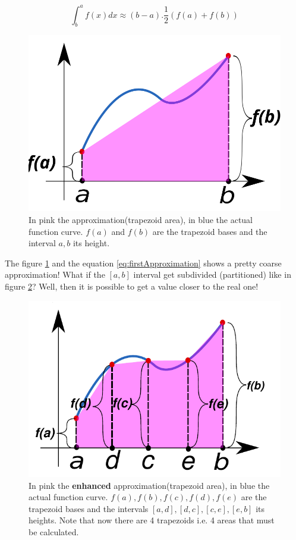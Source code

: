 	\begin{equation}
		\int^a_b{f(x) dx} \approx (b-a).\dfrac{1}{2}(f(a)+f(b))
		\label{eq:firstApproximation}
	\end{equation}

	\begin{figure}[h]
		\centering
		\includegraphics[width=0.7\linewidth]{images/Trapezoidal_rule_illustration}
		\caption[Approximation of an integral]{In pink the approximation(trapezoid area), in blue the actual function curve. $f(a)$ and $f(b)$ are the trapezoid bases and the interval $a, b$ its height. }
		\label{fig:trapezoidalruleillustration}
	\end{figure}
	
	\par The figure \ref{fig:trapezoidalruleillustration} and the equation \ref{eq:firstApproximation} shows a pretty coarse approximation! What if the $[a, b]$ interval get subdivided (partitioned) like in figure \ref{fig:trapezoidalruleillustration2}? Well, then it is possible to get a value closer to the real one!\newline
	
	\begin{figure}[h]
		\centering
		\includegraphics[width=0.7\linewidth]{images/Trapezoidal_rule_illustration2}
		\caption[Enhanced approximation of an integral]{In pink the \textbf{enhanced} approximation(trapezoid area), in blue the actual function curve. $f(a), f(b), f(c), f(d), f(e)$ are the trapezoid bases and the intervals $[a, d],[d,c], [c,e], [e,b]$ its heights. Note that now there are 4 trapezoids i.e. 4 areas that must be calculated. }
		\label{fig:trapezoidalruleillustration2}
	\end{figure}

